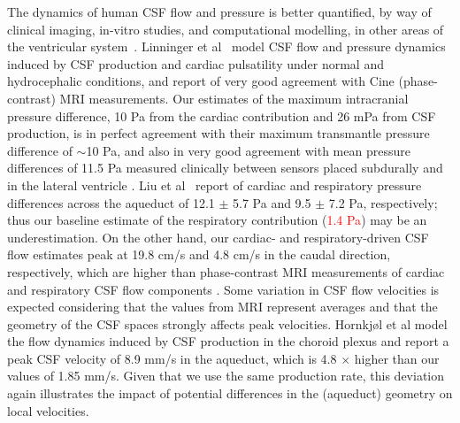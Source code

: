 \documentclass[fleqn,10pt]{wlscirep}
\newcommand{\fixme}[1]{\textcolor{red}{#1}}
\begin{document}
The dynamics of human CSF flow and pressure is better quantified, by
way of clinical imaging, in-vitro studies, and computational
modelling, in other areas of the ventricular
system~\cite{linninger2007cerebrospinal, sweetman2011cerebrospinal,
  vinje2019respiratory, hornkjol2022csf, causemann2022human,
  karki2025real, liu2025transmantle}. Linninger et
al~\cite{linninger2007cerebrospinal} model CSF flow and pressure
dynamics induced by CSF production and cardiac pulsatility under
normal and hydrocephalic conditions, and report of very good agreement
with Cine (phase-contrast) MRI measurements. Our estimates of the
maximum intracranial pressure difference, 10 Pa from the cardiac
contribution and 26 mPa from CSF production, is in perfect agreement
with their maximum transmantle pressure difference of $\sim$10 Pa, and
also in very good agreement with mean pressure differences of 11.5 Pa
measured clinically between sensors placed subdurally and in the
lateral ventricle \cite{vinje2019respiratory}. Liu et
al~\cite{liu2025transmantle} report of cardiac and respiratory
pressure differences across the aqueduct of 12.1 $\pm$ 5.7 Pa and 9.5
$\pm$ 7.2 Pa, respectively; thus our baseline estimate of the
respiratory contribution (\fixme{1.4 Pa}) may be an
underestimation. On the other hand, our cardiac- and
respiratory-driven CSF flow estimates peak at 19.8 cm/s and 4.8 cm/s
in the caudal direction, respectively, which are higher than
phase-contrast MRI measurements of cardiac and respiratory CSF flow
components \cite{takizawa2017characterization,
  yildiz2017quantifying}. Some variation in CSF flow velocities is
expected considering that the values from MRI represent averages
\cite{yildiz2017quantifying} and that the geometry of the CSF spaces
strongly affects peak velocities\cite{vinje2019respiratory,
  causemann2022human}. Hornkjøl et al \cite{hornkjol2022csf} model the
flow dynamics induced by CSF production in the choroid plexus and
report a peak CSF velocity of 8.9 mm/s in the aqueduct, which is 4.8
$\times$ higher than our values of 1.85 mm/s. Given that we use the
same production rate, this deviation again illustrates the impact of
potential differences in the (aqueduct) geometry on local velocities.
\end{document}
